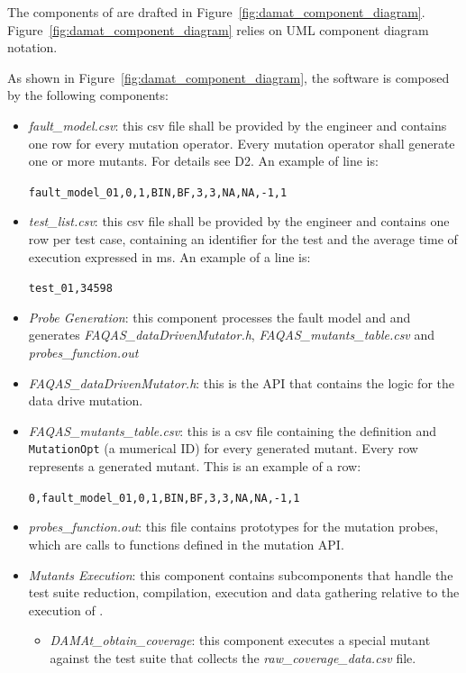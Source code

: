 The components of \dama are drafted in Figure~\ref{fig:damat_component_diagram}. Figure~\ref{fig:damat_component_diagram} relies on UML component diagram notation.

As shown in Figure~\ref{fig:damat_component_diagram}, the software is composed by the following components:

\begin{itemize}
  \item \textit{fault\_model.csv}: this csv file shall be provided by the engineer and contains one row for every mutation operator. Every mutation operator shall generate one or more mutants.
  For details see D2. An example of line is:

  \texttt{fault\_model\_01,0,1,BIN,BF,3,3,NA,NA,-1,1}

  \item \textit{test\_list.csv}: this csv file shall be provided by the engineer and contains one row per test case, containing an identifier for the test and the average time of execution expressed in ms. An example of a line is:

  \texttt{test\_01,34598}

  \item \textit{Probe  Generation}: this component processes the fault model and and generates \textit{FAQAS\_dataDrivenMutator.h}, \textit{FAQAS\_mutants\_table.csv}  and \textit{probes\_function.out}
  \item \textit{FAQAS\_dataDrivenMutator.h}: this is the API that contains the logic for the data drive mutation.
  \item \textit{FAQAS\_mutants\_table.csv}: this is a csv file containing the definition and \texttt{MutationOpt} (a mumerical ID) for every generated mutant. Every row represents a generated mutant. This is an example of a row:

  \texttt{0,fault\_model\_01,0,1,BIN,BF,3,3,NA,NA,-1,1}

  \item \textit{probes\_function.out}: this file contains prototypes for the mutation probes, which are calls to functions defined in the mutation API.
  \item \textit{Mutants Execution}: this component contains subcomponents that handle the test suite reduction, compilation, execution and data gathering relative to the execution of \dama.
  \begin{itemize}
    \item \textit{DAMAt\_obtain\_coverage}: this component executes a special mutant against the test suite that collects the \textit{raw\_coverage\_data.csv} file.


\end{itemize}
\end{itemize}
